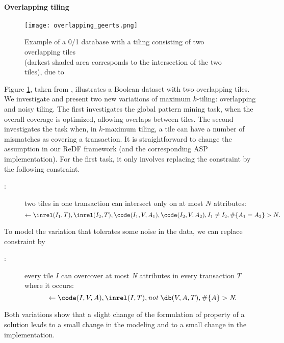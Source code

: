 \paragraph{Overlapping tiling}
\begin{figure}[thb]
  \begin{center}
  \texttt{[image: overlapping\_geerts.png]}
  \caption{Example of a 0/1 database with a tiling consisting of two overlapping tiles\\
  (darkest shaded area corresponds to the intersection of the two tiles), due to \cite{tiling}}
  \label{fig:geerts_overlapping}
\end{center}
\end{figure}
\label{subsubsec:overlapping_tiling}
Figure \ref{fig:geerts_overlapping}, taken from \cite{tiling}, illustrates a Boolean dataset with two overlapping tiles. We investigate and present two new variations of maximum $k$-tiling: overlapping and noisy tiling. The first investigates the global pattern mining task, when the overall coverage is optimized, allowing overlaps between tiles. The second investigates the task when, in $k$-maximum tiling, a tile can have a number of mismatches as covering a transaction. It is straightforward to change the assumption in our ReDF framework (and the corresponding ASP implementation). For the first task, it only involves replacing the constraint \intersectionConstraint by the following constraint.
\begin{description}
\item[\overlappingTilesConstraint:] two tiles in one transaction can intersect only on at most $N$ attributes:
\begin{equation*}
\leftarrow  \inrel(I_1,T), \inrel(I_2,T), \code(I_1,V,A_1), \code(I_2,V,A_2), I_1 \neq I_2, \# \{  A_1 = A_2\} > N.
\end{equation*}
\end{description}
To model the variation that tolerates some noise in the data, we can replace  constraint \overcoverageConstraint by 
\begin{description}
\item[\noiseConstraint:] every tile $I$ can overcover at most \textit{N} attributes in every transaction $T$ where it occurs: %
\begin{equation*}
\leftarrow  \code(I,V,A),\inrel(I,T), \textit{not}~ \db(V, A, T), \# \{ A \} > \textit{N}.
\end{equation*}
\end{description}
Both variations show that a slight change of the formulation of property of a solution leads to a small change in the modeling and to a small change in the implementation. 


